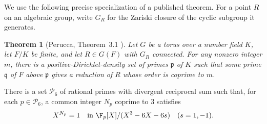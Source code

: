 \documentclass[11pt,a4paper]{article}
\newtheorem{theorem}{Theorem}[section]
\theoremstyle{definition}\newtheorem{definition}[theorem]{Definition}
\theoremstyle{remark}\newtheorem{remark}[theorem]{Remark}
\begin{document}
We use the following precise specialization of a published theorem.
For a point $R$ on an algebraic group, write $G_R$ for the Zariski
closure of the cyclic subgroup it generates.

\begin{theorem}[Perucca, Theorem~3.1 \cite{R08-Perucca}]\label{R08:thm:perucca}
Let $G$ be a torus over a number field $K$, let $F/K$ be finite,
and let $R\in G(F)$ with $G_R$ connected.
For any nonzero integer $m$, there is a positive-Dirichlet-density set
of primes $\mathfrak p$ of $K$ such that some prime $\mathfrak q$ of
$F$ above $\mathfrak p$ gives a reduction of $R$ whose order is coprime to $m$.
\end{theorem}

\begin{proposition}\label{R08:prop:C6}
There is a set $\mathcal P_6$ of rational primes with divergent
reciprocal sum such that, for each $p\in\mathcal P_6$, a common integer
$N_p$ coprime to $3$ satisfies
\[
       X^{N_p}=1\quad\text{in }\F_p[X]/(X^3-6X-6s)
                              \quad(s=1,-1).
\]
\end{proposition}
\end{document}
